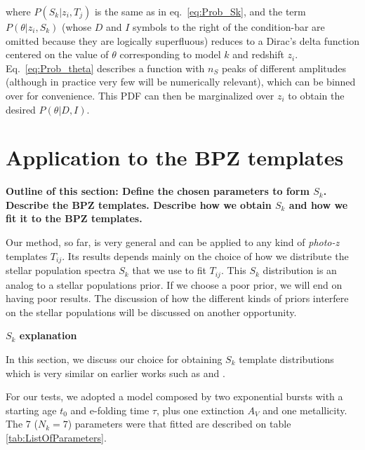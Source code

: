 \documentclass[a4paper, useAMS, usenatbib, hyperpdf]{mn2e}
\begin{document}
\noindent where $P(S_k | z_i,T_j)$ is the same as in eq.\ \ref{eq:Prob_Sk}, and the term $P(\theta | z_i , S_k)$ (whose $D$ and $I$ symbols to the right of the condition-bar are omitted because they are logically superfluous) reduces to a Dirac's delta function centered on the value of $\theta$ corresponding to model $k$ and redshift $z_i$.  Eq.\ \ref{eq:Prob_theta} describes a function with $n_S$ peaks of different amplitudes (although in practice very few will be numerically relevant), which can be binned over for convenience. This PDF can then be marginalized over $z_i$ to obtain the desired $P(\theta | D , I)$.




\section{Application to the BPZ templates}
\label{sec:fit}
{\bf {\color{red} Outline of this section: Define the chosen parameters to form $S_k$. Describe the BPZ templates. Describe how we obtain $S_k$ and how we fit it to the BPZ templates.}}

Our method, so far, is very general and can be applied to any kind of {\it photo-z} templates $T_{ij}$. Its results depends mainly on the choice of how we distribute the stellar population spectra $S_k$ that we use to fit $T_{ij}$. This $S_k$ distribution is an analog to a stellar populations prior. If we choose a poor prior, we will end on having poor results. The discussion of how the different kinds of priors interfere on the stellar populations will be discussed on another opportunity.

{\bf {\color{red} $S_k$ explanation}}

In this section, we discuss our choice for obtaining $S_k$ template distributions which is very similar on earlier works such as \cite{Taylor.etal.2011a} and \citep{Brinchmann.etal.2004a}.

For our tests, we adopted a model composed by two exponential bursts with a starting age $t_0$ and e-folding time $\tau$, plus one extinction $A_V$ and one metallicity. The 7 ($N_k = 7$) parameters were that fitted are described on table \ref{tab:ListOfParameters}.
\end{document}
